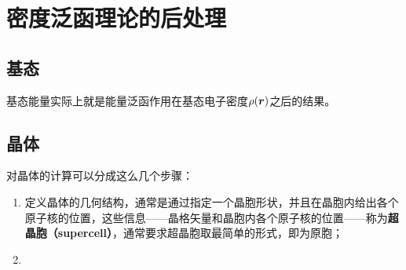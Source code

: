 \documentclass[hyperref, UTF8, a4paper]{ctexart}
\begin{document}
\section{密度泛函理论的后处理}

\subsection{基态}

基态能量实际上就是能量泛函作用在基态电子密度$\rho(\vb*{r})$之后的结果。

\subsection{晶体}

对晶体的计算可以分成这么几个步骤：
\begin{enumerate}
    \item 定义晶体的几何结构，通常是通过指定一个晶胞形状，并且在晶胞内给出各个原子核的位置，这些信息——晶格矢量和晶胞内各个原子核的位置——称为\textbf{超晶胞（supercell）}，通常要求超晶胞取最简单的形式，即为原胞；
    \item 
\end{enumerate}
\end{document}
